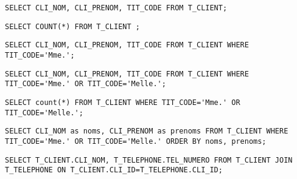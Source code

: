 

\begin{lstlisting}
SELECT CLI_NOM, CLI_PRENOM, TIT_CODE FROM T_CLIENT;
\end{lstlisting}


\begin{lstlisting}
SELECT COUNT(*) FROM T_CLIENT ;
\end{lstlisting}



\begin{lstlisting}
SELECT CLI_NOM, CLI_PRENOM, TIT_CODE FROM T_CLIENT WHERE TIT_CODE='Mme.';
\end{lstlisting}


\begin{lstlisting}
SELECT CLI_NOM, CLI_PRENOM, TIT_CODE FROM T_CLIENT WHERE TIT_CODE='Mme.' OR TIT_CODE='Melle.';
\end{lstlisting}


\begin{lstlisting}
SELECT count(*) FROM T_CLIENT WHERE TIT_CODE='Mme.' OR TIT_CODE='Melle.';
\end{lstlisting}


\begin{lstlisting}
SELECT CLI_NOM as noms, CLI_PRENOM as prenoms FROM T_CLIENT WHERE TIT_CODE='Mme.' OR TIT_CODE='Melle.' ORDER BY noms, prenoms;
\end{lstlisting}


\begin{lstlisting}
SELECT T_CLIENT.CLI_NOM, T_TELEPHONE.TEL_NUMERO FROM T_CLIENT JOIN T_TELEPHONE ON T_CLIENT.CLI_ID=T_TELEPHONE.CLI_ID;
\end{lstlisting}

